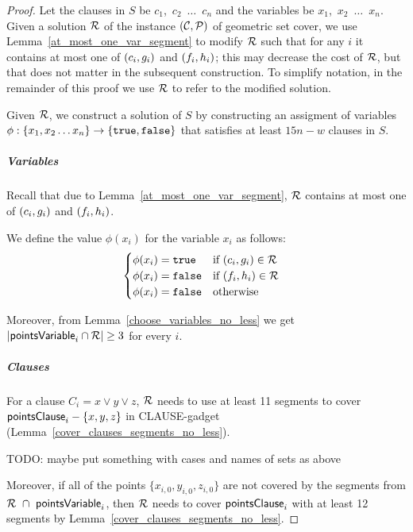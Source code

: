 \begin{proof}\leavevmode
Let the clauses in $S$ be $c_1$,~$c_2$~$\ldots$~$c_n$
and the variables be $x_1$,~$x_2$~$\ldots$~$x_n$.
Given a solution $\mathcal{R}$
of the instance $(\mathcal{C}, \mathcal{P})$ of geometric set cover, we use Lemma~\ref{at_most_one_var_segment} to modify $\mathcal{R}$ such that for any $i$ it contains at most one of $(c_{i}, g_{i})$ and $(f_{i}, h_{i})$; this may decrease the cost of $\mathcal{R}$, but that does not matter in the subsequent construction. To simplify notation, in the remainder of this proof we use $\mathcal{R}$ to refer to the modified solution.

Given $\mathcal{R}$, we construct a solution of $S$ by constructing an
assigment of variables 
$\phi : \{ x_1, x_2 \ldots x_n\} \rightarrow \{\texttt{true}, \texttt{false}\}$
that satisfies at least $15n-w$ clauses in $S$.

\subparagraph{Variables}
Recall that due to Lemma~\ref{at_most_one_var_segment}, $\mathcal{R}$ contains at most one of $(c_{i}, g_{i})$ and $(f_{i}, h_{i})$.

We define the value $\phi(x_i)$ for the variable $x_i$ as follows:
\begin{align}
	\begin{split}
	\label{eqn:variable_assignment}
	& \begin{cases}
	\phi(x_i) = \texttt{true} & \text{if}\ (c_{i}, g_{i}) \in \mathcal{R} \\
	\phi(x_i) = \texttt{false} & \text{if}\ (f_{i}, h_{i}) \in \mathcal{R} \\
	\phi(x_i) = \texttt{false} & \text{otherwise}
	\end{cases}
	\end{split}
\end{align}

Moreover, from Lemma~\ref{choose_variables_no_less} we get $|\mathsf{pointsVariable}_{i} \cap \mathcal{R}| \ge 3$ for every $i$.

\subparagraph{Clauses}

For a clause $C_i = x \lor y \lor z$,
$\mathcal{R}$ needs to use at least 11 segments to cover $\mathsf{pointsClause}_i - \{x, y, z\}$
in CLAUSE-gadget (Lemma~\ref{cover_clauses_segments_no_less}).

TODO: maybe put something with cases and names of sets as above

Moreover, if all of the points $\{x_{i,0}, y_{i,0}, z_{i,0}\}$
are not covered by the segments from $\mathcal{R}~\cap~\mathsf{pointsVariable}_{i}$,
then $\mathcal{R}$ needs to cover $\mathsf{pointsClause}_i$
with at least 12 segments
by Lemma~\ref{cover_clauses_segments_no_less}.



\end{proof}
